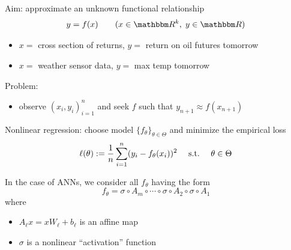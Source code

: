 \begin{frame}
    
    Aim: approximate an unknown functional relationship
    \begin{equation*}
        y = f(x)
        \qquad (x \in \RR^k, \; y \in \RR)
    \end{equation*}

    \Egs
    \begin{itemize}
        \item $x = $ cross section of returns, $y = $ return on oil futures tomorrow
        \vspace{0.5em}
        \item $x = $ weather sensor data, $y = $ max temp tomorrow
    \end{itemize}
        \vspace{0.5em}
        \vspace{0.5em}

    Problem:

    \begin{itemize}
        \item observe $(x_i, y_i)_{i=1}^n$ and seek $f$ such that $y_{n+1}
            \approx f(x_{n+1})$
    \end{itemize}


\end{frame}



\begin{frame}

    Nonlinear regression: choose model $\{f_\theta\}_{\theta \in \Theta}$ and minimize the empirical loss
    \begin{equation*}
        \ell(\theta) := \frac{1}{n}\sum_{i=1}^n (y_i - f_\theta(x_i))^2
        \quad \ \mathrm{s.t.}\  \quad \theta \in \Theta
    \end{equation*}


    \pause
    \vspace{0.5em}
    In the case of ANNs, we consider all $f_\theta$ having the form
    \begin{equation*}
        f_\theta
        = \sigma \circ A_{m} 
            \circ \cdots \circ \sigma \circ A_{2}  \circ \sigma \circ A_{1}
    \end{equation*}
    where
    \begin{itemize}
        \item $A_{\ell} x = x W_\ell + b_\ell $ is an affine map 
        \vspace{0.5em}
        \item $\sigma$ is a nonlinear ``activation'' function
    \end{itemize}

\end{frame}

